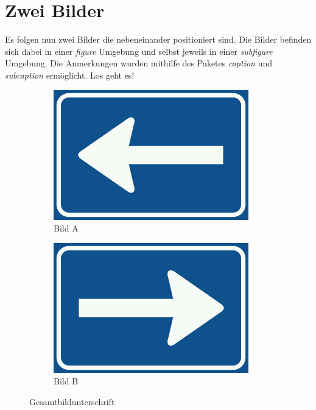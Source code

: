 \documentclass{scrreprt}
\begin{document}
\newpage

\section{Zwei Bilder \cite{ref4}}
\label{se:zweibilder}

Es folgen nun zwei Bilder die nebeneinander positioniert sind. Die Bilder befinden sich dabei
in einer \textit{figure} Umgebung und selbst jeweils in einer \textit{subfigure} Umgebung. Die Anmerkungen wurden mithilfe des Paketes \textit{caption} und \textit{subcaption} ermöglicht. Los geht es!
\vspace{10pt}
\begin{figure}[h!]
	\centering
	\begin{subfigure}{.5\textwidth}
		\centering
		\includegraphics[width=.9\linewidth]{images/Nederlands_verkeersbord_C4_(links).png}
		\caption{Bild A}
		\label{fig:bilda}
		
	\end{subfigure}%
	\begin{subfigure}{.5\textwidth}
		\centering
		\includegraphics[width=.9\linewidth]{images/Nederlands_verkeersbord_C4_(rechts).png}
		\caption{Bild B}
		\label{fig:bildb}
		
	\end{subfigure}
	\caption{Gesamtbildunterschrift}

\end{figure}
\end{document}
